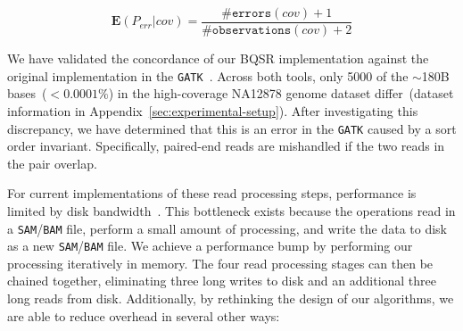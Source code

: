 \documentclass{acm_proc_article-sp}
\begin{document}
\begin{enumerate}
\begin{equation}
\label{eqn:bqsrerr}
\mathbf{E}(P_{err}|{cov}) = \frac{\texttt{\#errors}(cov) + 1}{\texttt{\#observations}(cov) + 2}
\end{equation}

We have validated the concordance of our BQSR implementation against the original implementation in the
\texttt{GATK}~\cite{depristo11}. Across both tools, only 5000
of the $\sim$180B bases~($<0.0001\%$) in the high-coverage \linebreak NA12878 genome dataset differ~(dataset
information in Appendix~\ref{sec:experimental-setup}). After investigating this discrepancy, we have determined that this is
an error in the \texttt{GATK} caused by a sort order invariant. Specifically, paired-end reads are mishandled if the two reads in the
pair overlap.
\end{enumerate}

For current implementations of these read processing steps, performance is limited by disk
bandwidth~\cite{diao15}. This bottleneck exists because the operations read in a \texttt{SAM}/\texttt{BAM} file, perform
a small amount of processing, and write the data to disk as a new \texttt{SAM}/\texttt{BAM} file. We achieve a
performance bump by performing our processing iteratively in memory. The four read processing stages
can then be chained together, eliminating three long writes to disk and an additional three long reads
from disk. Additionally, by rethinking the design of our algorithms, we are able to reduce overhead in
several other ways:
\end{document}
